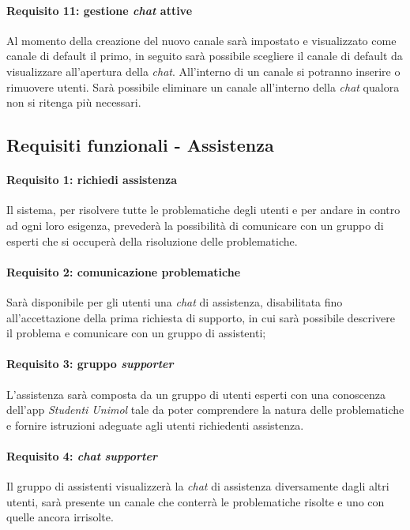 \paragraph{Requisito 11: gestione \emph{chat} attive\\}
Al momento della creazione del nuovo canale sarà impostato e visualizzato come canale di default il primo, in seguito sarà possibile scegliere il canale di default da visualizzare all’apertura della \emph{chat}. All’interno di un canale si potranno inserire o rimuovere utenti. Sarà possibile eliminare un canale all’interno della \emph{chat} qualora non si ritenga più necessari.

\subsection{Requisiti funzionali - Assistenza}
\paragraph{Requisito 1: richiedi assistenza\\}
Il sistema, per risolvere tutte le problematiche degli utenti e per andare in contro ad ogni loro esigenza, prevederà la possibilità di comunicare con un gruppo di esperti che si occuperà della risoluzione delle problematiche.

\paragraph{Requisito 2: comunicazione problematiche\\}
Sarà disponibile per gli utenti una \emph{chat} di assistenza, disabilitata fino all’accettazione della prima richiesta di supporto, in cui sarà possibile descrivere il problema e comunicare con un gruppo di assistenti;

\paragraph{Requisito 3: gruppo \emph{supporter}\\}
L’assistenza sarà composta da un gruppo di utenti esperti con una conoscenza dell’app \emph{Studenti Unimol} tale da poter comprendere la natura delle problematiche e fornire istruzioni adeguate agli utenti richiedenti assistenza. 

\paragraph{Requisito 4: \emph{chat} \emph{supporter}\\}
Il gruppo di assistenti visualizzerà la \emph{chat} di assistenza diversamente dagli altri utenti, sarà presente un canale che conterrà le problematiche risolte e uno con quelle ancora irrisolte.


